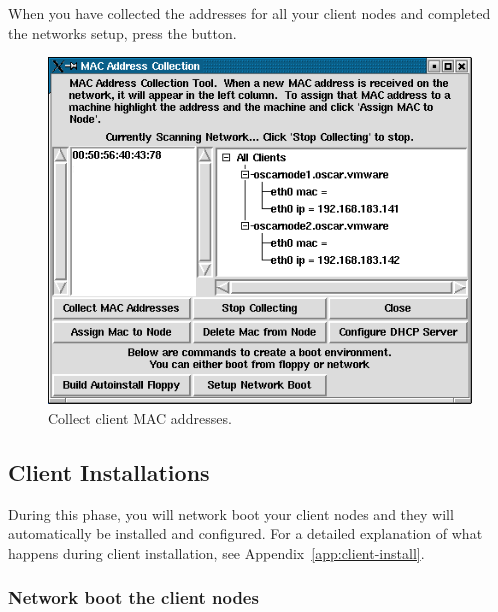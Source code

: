 When you have collected the addresses for all your client nodes and
completed the networks setup, press the  button.

\begin{figure}[htbp]
  \begin{center}
    \includegraphics[scale=\imgscale]{figs/6e_sbs-found-mac}
    \caption{Collect client MAC addresses.}
    \label{fig:detailed-collect-mac}
  \end{center}
\end{figure}


\subsection{Client Installations}
\label{det:client-install}

During this phase, you will network boot your client nodes and they
will automatically be installed and configured.  For a detailed
explanation of what happens during client installation, see
Appendix~\ref{app:client-install}.


\subsubsection{Network boot the client nodes}

